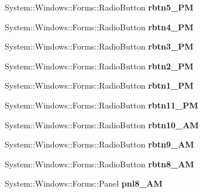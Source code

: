 \begin{DoxyCompactItemize}
System\+::\+Windows\+::\+Forms\+::\+Radio\+Button {\bfseries rbtn5\+\_\+PM}
\item 
\mbox{\label{class_project1_1_1_my_form_ae3709ea05cbebfa1dd1b7c71f0cae7b1}} 
System\+::\+Windows\+::\+Forms\+::\+Radio\+Button {\bfseries rbtn4\+\_\+PM}
\item 
\mbox{\label{class_project1_1_1_my_form_af33294cc0a090e670e57a04be139ed17}} 
System\+::\+Windows\+::\+Forms\+::\+Radio\+Button {\bfseries rbtn3\+\_\+PM}
\item 
\mbox{\label{class_project1_1_1_my_form_a1c01e145fb0624bb81f4568efb7e3235}} 
System\+::\+Windows\+::\+Forms\+::\+Radio\+Button {\bfseries rbtn2\+\_\+PM}
\item 
\mbox{\label{class_project1_1_1_my_form_a18f831bc4f34b9fd0766dec52e8a87e3}} 
System\+::\+Windows\+::\+Forms\+::\+Radio\+Button {\bfseries rbtn1\+\_\+PM}
\item 
\mbox{\label{class_project1_1_1_my_form_a91a8cf30f1830274dd4d76021928d288}} 
System\+::\+Windows\+::\+Forms\+::\+Radio\+Button {\bfseries rbtn11\+\_\+PM}
\item 
\mbox{\label{class_project1_1_1_my_form_a8d53517913306495dabb3d2a8ba38795}} 
System\+::\+Windows\+::\+Forms\+::\+Radio\+Button {\bfseries rbtn10\+\_\+AM}
\item 
\mbox{\label{class_project1_1_1_my_form_a0344d73f2fb235187be8c5294ae7a92e}} 
System\+::\+Windows\+::\+Forms\+::\+Radio\+Button {\bfseries rbtn9\+\_\+AM}
\item 
\mbox{\label{class_project1_1_1_my_form_a1e7291398be22db1d2675f02f3f01643}} 
System\+::\+Windows\+::\+Forms\+::\+Radio\+Button {\bfseries rbtn8\+\_\+AM}
\item 
\mbox{\label{class_project1_1_1_my_form_a93eb4a4759b57ae56c6b561894c3c35d}} 
System\+::\+Windows\+::\+Forms\+::\+Panel {\bfseries pnl8\+\_\+AM}
\item 

\end{DoxyCompactItemize}
